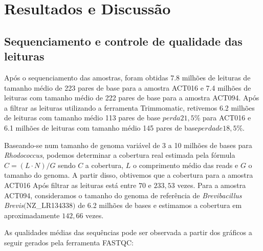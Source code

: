 \chapter{Resultados e Discussão}\label{cap:resultados}

\section{Sequenciamento e controle de qualidade das leituras}
Após o sequenciamento das amostras, foram obtidas 7.8 milhões de leituras de tamanho médio de 
223 pares de base para a amostra ACT016 e 7.4 milhões de leituras com tamanho médio de 222 pares de base
para a amostra ACT094. Após a filtrar as leituras utilizando a ferramenta Trimmomatic, retivemos
6.2 milhões de leituras com tamanho médio 113 pares de base \(perda 21,5\%\) para ACT016 e 6.1 milhões
de leituras com tamanho médio 145 pares de base\(perda de 18,5\%\).

Baseando-se num tamanho de genoma variável de 3 a 10 milhões de bases para \textit{Rhodococcus}, podemos
determinar a cobertura real estimada pela fórmula $C= (L\cdot N)/G $ sendo $C$ a cobertura, $L$ o comprimento
médio das reads e $G$ o tamanho do genoma. A partir disso, obtivemos que a cobertura para a amostra ACT016 Após
filtrar as leituras está entre $70$ e $233,53$ vezes. 
Para a amostra ACT094, consideramos o tamanho do genoma de referência de \textit{Brevibacillus Brevis}$($NZ\_LR134338$)$ 
de 6.2 milhões de bases e estimamos a cobertura em aproximadamente $142,66$ vezes.

As qualidades médias das sequências pode ser observada a partir dos gráficos a seguir gerados pela ferramenta FASTQC:

